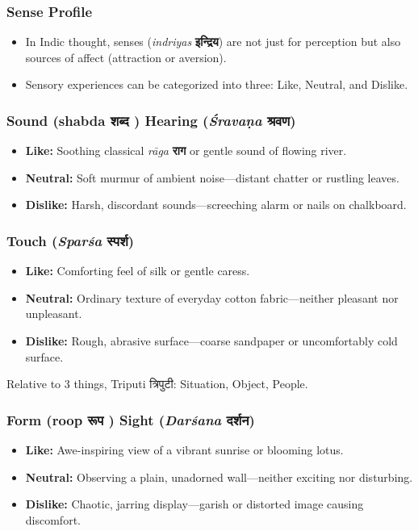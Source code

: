 \begin{frame}[fragile]\frametitle{Sense Profile}
      \begin{itemize}
          \item In Indic thought, senses (\textit{indriyas} \textbf{इन्द्रिय}) are not just for perception but also sources of affect (attraction or aversion).
          \item Sensory experiences can be categorized into three: Like, Neutral, and Dislike.
      \end{itemize}
\end{frame}

\begin{frame}[fragile]\frametitle{Sound (shabda शब्द ) Hearing (\textit{Śravaṇa} \textbf{श्रवण})}
      \begin{itemize}
          \item \textbf{Like:} Soothing classical \textit{rāga} \textbf{राग} or gentle sound of flowing river.
          \item \textbf{Neutral:} Soft murmur of ambient noise—distant chatter or rustling leaves.
          \item \textbf{Dislike:} Harsh, discordant sounds—screeching alarm or nails on chalkboard.
      \end{itemize}
\end{frame}

\begin{frame}[fragile]\frametitle{Touch (\textit{Sparśa} \textbf{स्पर्श})}
      \begin{itemize}
          \item \textbf{Like:} Comforting feel of silk or gentle caress.
          \item \textbf{Neutral:} Ordinary texture of everyday cotton fabric—neither pleasant nor unpleasant.
          \item \textbf{Dislike:} Rough, abrasive surface—coarse sandpaper or uncomfortably cold surface.
      \end{itemize}
	  
Relative to 3 things, Triputi त्रिपुटी:  Situation, Object, People.
\end{frame}

\begin{frame}[fragile]\frametitle{Form (roop रूप ) Sight (\textit{Darśana} \textbf{दर्शन})}
      \begin{itemize}
          \item \textbf{Like:} Awe-inspiring view of a vibrant sunrise or blooming lotus.
          \item \textbf{Neutral:} Observing a plain, unadorned wall—neither exciting nor disturbing.
          \item \textbf{Dislike:} Chaotic, jarring display—garish or distorted image causing discomfort.
      \end{itemize}
\end{frame}


